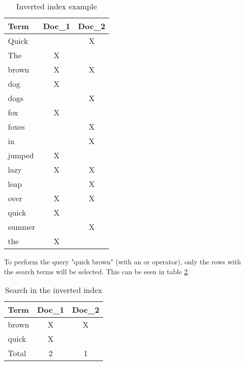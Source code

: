 \begin{table}
    \centering
    \begin{tabular}{ | l | c | c | }
        \hline
        Term    & Doc\_1 & Doc\_2 \\ \hline
        \hline
        Quick   &       &   X   \\
        The     &   X   &       \\
        brown   &   X   &   X   \\
        dog     &   X   &       \\
        dogs    &       &   X   \\
        fox     &   X   &       \\
        foxes   &       &   X   \\
        in      &       &   X   \\
        jumped  &   X   &       \\
        lazy    &   X   &   X   \\
        leap    &       &   X   \\
        over    &   X   &   X   \\
        quick   &   X   &       \\
        summer  &       &   X   \\
        the     &   X   &       \\
        \hline
    \end{tabular}
    \caption{Inverted index example \autocite{elasticsearch_iindex}}
    \label{tab:iindex1}
\end{table}

To perform the query "quick brown" (with an or operator), only the rows with the search terms will be selected. This can be seen in table \ref{tab:iindex2}.

\begin{table}
    \centering
    \begin{tabular}{ | l | c | c | }
        \hline
        Term    & Doc\_1 & Doc\_2 \\ \hline
        \hline
        brown   &   X   &   X   \\
        quick   &   X   &       \\
        \hline
        Total   &   2   &   1   \\
        \hline
    \end{tabular}
    \caption{Search in the inverted index \autocite{elasticsearch_iindex}}
    \label{tab:iindex2}
\end{table}

